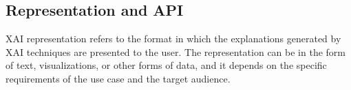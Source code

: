 \documentclass[conference]{IEEEtran}
\begin{document}
\subsection{Representation and API}
XAI representation refers to the format in which the explanations generated by XAI techniques are presented to the user. The representation can be in the form of text, visualizations, or other forms of data, and it depends on the specific requirements of the use case and the target audience.
\end{document}
